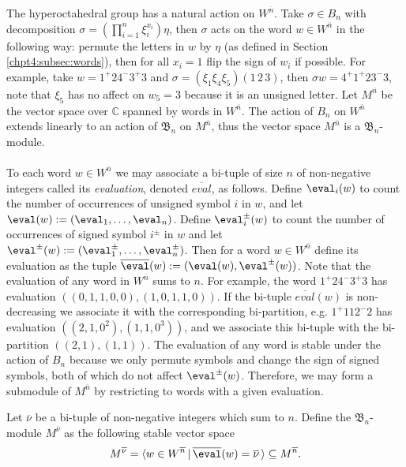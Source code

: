 \documentclass[11pt]{report}
\begin{document}
The hyperoctahedral group has a natural action on $W^{\overline{n}}$. Take $\sigma \in B_{n}$ with decomposition $\sigma = \left( \prod_{i=1}^{n} \xi_{i}^{x_{i}} \right) \eta $, then $\sigma$ acts on the word $w \in W^{\overline{n}}$ in the following way: permute the letters in $w$ by $\eta$ (as defined in Section \ref{chpt4:subsec:words}), then for all $x_{i}=1$ flip the sign of $w_{i}$ if possible.
For example, take $ w = 1^{+}2 4^{-}3^{+}3$ and $\sigma = \left(\xi_{1}\xi_{4}\xi_{5}\right) (1 \, 2 \, 3)$, then $\sigma w = 4^{+}1^{+}23^{-}3$, note that $\xi_{5}$ has no affect on $w_{5} = 3$ because it is an unsigned letter. Let $M^{\overline{n}}$ be the vector space over $\mathbb{C}$ spanned by words in $W^{\overline{n}}$. The action of $B_{n}$ on $W^{\overline{n}}$ extends linearly to an action of $\mathfrak{B}_{n}$ on $M^{\overline{n}}$, thus the vector space $M^{\overline{n}}$ is a $\mathfrak{B}_{n}$-module.

\paragraph{}
To each word $w \in W^{\overline{n}}$ we may associate a bi-tuple of size $n$ of non-negative integers called its \emph{evaluation}, denoted $\overline{eval}$, as follows. Define $\eval_i(w)$ to count the number of occurrences of unsigned symbol $i$ in $w$, and let $\eval(w) := (\eval_{1}, \ldots, \eval_{n})$. Define $\eval_{i}^{\pm}(w)$ to count the number of occurrences of signed symbol $i^{\pm}$ in $w$ and let $\eval^{\pm}(w) := (\eval_{1}^{\pm}, \ldots, \eval_{n}^{\pm})$. Then for a word $w \in W^{\overline{n}}$ define its evaluation as the tuple $\overline{\eval}(w) := (\eval(w), \eval^{\pm}(w))$.  Note that the evaluation of any word in $W^{\overline{n}}$ sums to $n$. For example, the word $1^{+}24^{-}3^{+}3$ has evaluation $((0,1,1,0,0),(1,0,1,1,0))$. If the bi-tuple $\overline{eval}(w)$ is non-decreasing we associate it with the corresponding bi-partition, e.g. $1^{+}112^{-}2$ has evaluation $((2,1,0^{2}),(1,1,0^{3}))$, and we associate this bi-tuple with the bi-partition $((2,1),(1,1))$.
The evaluation of any word is stable under the action of $B_{n}$ because we only permute symbols and change the sign of signed symbols, both of which do not affect $\eval^{\pm}(w)$. Therefore, we may form a submodule of $M^{\overline{n}}$ by restricting to words with a given evaluation.

\begin{defn}
	Let $\overline{\nu}$ be a bi-tuple of non-negative integers which sum to $n$. Define the $\mathfrak{B}_{n}$-module $M^{\overline{\nu}}$ as the following stable vector space
	\[M^{\overline{\nu}} = \langle w \in W^{\overline{n}} \, | \, \overline{\eval}(w) = \overline{\nu} \, \rangle \subseteq M^{\overline{n}}.\]
\end{defn}
\end{document}
